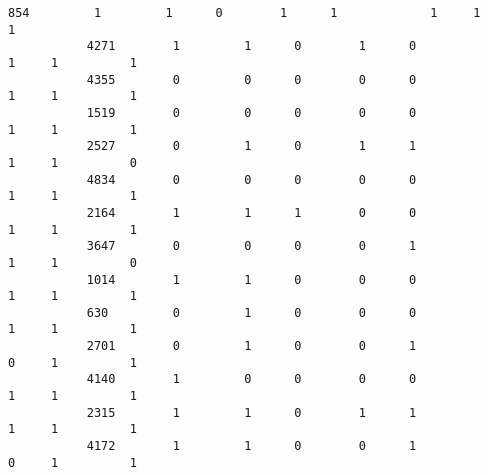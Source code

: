 \documentclass[11pt]{article}
\begin{document}
\begin{Verbatim}[commandchars=\\\{\}]
           854         1         1      0        1      1             1     1          1   
           4271        1         1      0        1      0             1     1          1   
           4355        0         0      0        0      0             1     1          1   
           1519        0         0      0        0      0             1     1          1   
           2527        0         1      0        1      1             1     1          0   
           4834        0         0      0        0      0             1     1          1   
           2164        1         1      1        0      0             1     1          1   
           3647        0         0      0        0      1             1     1          0   
           1014        1         1      0        0      0             1     1          1   
           630         0         1      0        0      0             1     1          1   
           2701        0         1      0        0      1             0     1          1   
           4140        1         0      0        0      0             1     1          1   
           2315        1         1      0        1      1             1     1          1   
           4172        1         1      0        0      1             0     1          1   
           

\end{Verbatim}
\end{document}
